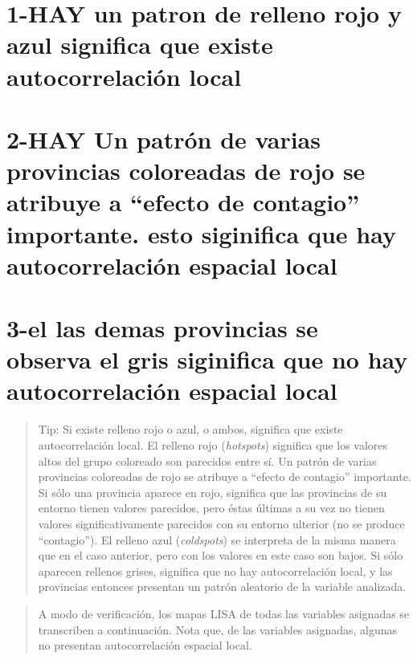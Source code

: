 \documentclass[11pt,]{article}
\begin{document}
\section{1-HAY un patron de relleno rojo y azul significa que existe
autocorrelación
local}\label{hay-un-patron-de-relleno-rojo-y-azul-significa-que-existe-autocorrelaciuxf3n-local}

\section{\texorpdfstring{2-HAY Un patrón de varias provincias coloreadas
de rojo se atribuye a ``efecto de contagio'' importante. esto siginifica
que hay autocorrelación espacial
local}{2-HAY Un patrón de varias provincias coloreadas de rojo se atribuye a efecto de contagio importante. esto siginifica que hay autocorrelación espacial local}}\label{hay-un-patruxf3n-de-varias-provincias-coloreadas-de-rojo-se-atribuye-a-efecto-de-contagio-importante.-esto-siginifica-que-hay-autocorrelaciuxf3n-espacial-local}

\section{3-el las demas provincias se observa el gris siginifica que no
hay autocorrelación espacial
local}\label{el-las-demas-provincias-se-observa-el-gris-siginifica-que-no-hay-autocorrelaciuxf3n-espacial-local}

\begin{quote}
Tip: Si existe relleno rojo o azul, o ambos, significa que existe
autocorrelación local. El relleno rojo (\emph{hotspots}) significa que
los valores altos del grupo coloreado son parecidos entre sí. Un patrón
de varias provincias coloreadas de rojo se atribuye a ``efecto de
contagio'' importante. Si sólo una provincia aparece en rojo, significa
que las provincias de su entorno tienen valores parecidos, pero éstas
últimas a su vez no tienen valores significativamente parecidos con su
entorno ulterior (no se produce ``contagio''). El relleno azul
(\emph{coldspots}) se interpreta de la misma manera que en el caso
anterior, pero con los valores en este caso son bajos. Si sólo aparecen
rellenos grises, significa que no hay autocorrelación local, y las
provincias entonces presentan un patrón aleatorio de la variable
analizada.
\end{quote}

\begin{quote}
A modo de verificación, los mapas LISA de todas las variables asignadas
se transcriben a continuación. Nota que, de las variables asignadas,
algunas no presentan autocorrelación espacial local.
\end{quote}
\end{document}

